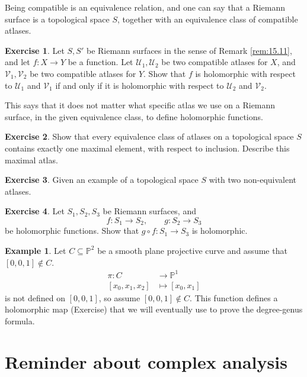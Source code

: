 \documentclass{article}
\renewcommand{\P}{\mathbb{P}}
\renewcommand{\sb}[1]{\left[ #1 \right]}
\theoremstyle{definition}\newtheorem{definition}{Definition}[section]
\theoremstyle{definition}\newtheorem{notation}[definition]{Notation}
\theoremstyle{definition}\newtheorem{remark}[definition]{Remark}
\theoremstyle{definition}\newtheorem{example1}[definition]{Example}
\theoremstyle{definition}\newtheorem{fact}{Fact}
\theoremstyle{definition}\newtheorem{exercise}{Exercise}
\theoremstyle{definition}\newtheorem*{example2}{Example}
\begin{document}
Being compatible is an equivalence relation, and one can say that a Riemann surface is a topological space $ S $, together with an equivalence class of compatible atlases.

\begin{exercise}
Let $ S, S' $ be Riemann surfaces in the sense of Remark \ref{rem:15.11}, and let $ f : X \to Y $ be a function. Let $ \mathcal{U}_1, \mathcal{U}_2 $ be two compatible atlases for $ X $, and $ \mathcal{V}_1, \mathcal{V}_2 $ be two compatible atlases for $ Y $. Show that $ f $ is holomorphic with respect to $ \mathcal{U}_1 $ and $ \mathcal{V}_1 $ if and only if it is holomorphic with respect to $ \mathcal{U}_2 $ and $ \mathcal{V}_2 $.
\end{exercise}

This says that it does not matter what specific atlas we use on a Riemann surface, in the given equivalence class, to define holomorphic functions.

\begin{exercise}
Show that every equivalence class of atlases on a topological space $ S $ contains exactly one maximal element, with respect to inclusion. Describe this maximal atlas.
\end{exercise}

\begin{exercise}
Given an example of a topological space $ S $ with two non-equivalent atlases.
\end{exercise}

\begin{exercise}
Let $ S_1, S_2, S_3 $ be Riemann surfaces, and
$$ f : S_1 \to S_2, \qquad g : S_2 \to S_3 $$
be holomorphic functions. Show that $ g \circ f : S_1 \to S_3 $ is holomorphic.
\end{exercise}

\begin{example1}
\label{eg:15.12}
Let $ C \subseteq \P^2 $ be a smooth plane projective curve and assume that $ \sb{0, 0, 1} \notin C $.
\begin{align*}
\pi : C & \to \P^1 \\
\sb{x_0, x_1, x_2} & \mapsto \sb{x_0, x_1}
\end{align*}
is not defined on $ \sb{0, 0, 1} $, so assume $ \sb{0, 0, 1} \notin C $. This function defines a holomorphic map (Exercise) that we will eventually use to prove the degree-genus formula.
\end{example1}

\pagebreak

\section{Reminder about complex analysis}
\end{document}
